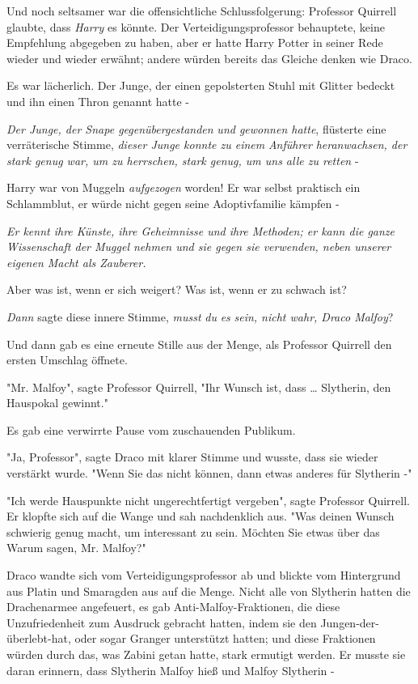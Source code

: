 {Und noch seltsamer war die offensichtliche Schlussfolgerung: Professor Quirrell glaubte, dass \emph{Harry} es könnte. Der Verteidigungsprofessor behauptete, keine Empfehlung abgegeben zu haben, aber er hatte Harry Potter in seiner Rede wieder und wieder erwähnt; andere würden bereits das Gleiche denken wie Draco.

Es war lächerlich. Der Junge, der einen gepolsterten Stuhl mit Glitter bedeckt und ihn einen Thron genannt hatte -

\emph{Der Junge, der Snape gegenübergestanden} \emph{und gewonnen hatte}, flüsterte eine verräterische Stimme, \emph{dieser Junge konnte zu einem} \emph{Anführer} \emph{heranwachsen, der stark genug war, um zu herrschen, stark genug, um uns alle zu retten} -

Harry war von Muggeln \emph{aufgezogen} worden! Er war selbst praktisch ein Schlammblut, er würde nicht gegen seine Adoptivfamilie kämpfen -

\emph{Er kennt ihre Künste, ihre Geheimnisse und ihre Methoden; er kann die ganze Wissenschaft der Muggel nehmen und sie gegen sie verwenden, neben unserer eigenen Macht als Zauberer.}

Aber was ist, wenn er sich weigert? Was ist, wenn er zu schwach ist?

\emph{Dann} sagte diese innere Stimme, \emph{musst} \emph{du} \emph{es} \emph{sein, nicht wahr, Draco Malfoy}?

Und dann gab es eine erneute Stille aus der Menge, als Professor Quirrell den ersten Umschlag öffnete.

"Mr. Malfoy", sagte Professor Quirrell, "Ihr Wunsch ist, dass … Slytherin, den Hauspokal gewinnt."

Es gab eine verwirrte Pause vom zuschauenden Publikum.

"Ja, Professor", sagte Draco mit klarer Stimme und wusste, dass sie wieder verstärkt wurde. "Wenn Sie das nicht können, dann etwas anderes für Slytherin -"

"Ich werde Hauspunkte nicht ungerechtfertigt vergeben", sagte Professor Quirrell. Er klopfte sich auf die Wange und sah nachdenklich aus. "Was deinen Wunsch schwierig genug macht, um interessant zu sein. Möchten Sie etwas über das Warum sagen, Mr. Malfoy?"

Draco wandte sich vom Verteidigungsprofessor ab und blickte vom Hintergrund aus Platin und Smaragden aus auf die Menge. Nicht alle von Slytherin hatten die Drachenarmee angefeuert, es gab Anti-Malfoy-Fraktionen, die diese Unzufriedenheit zum Ausdruck gebracht hatten, indem sie den Jungen-der-überlebt-hat, oder sogar Granger unterstützt hatten; und diese Fraktionen würden durch das, was Zabini getan hatte, stark ermutigt werden. Er musste sie daran erinnern, dass Slytherin Malfoy hieß und Malfoy Slytherin -

}
